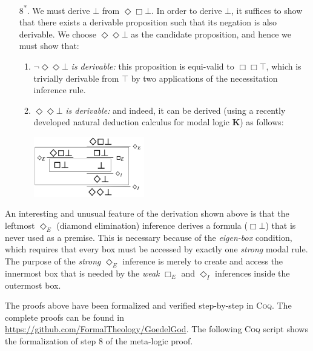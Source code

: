 \documentclass{llncs}
\newcommand{\logic}[1]{\textbf{#1}\xspace}
\newcommand{\K}{\logic{K}}
\newcommand{\Dia}{\Diamond} %
\newcommand{\nec}{\Box}
\newcommand{\pos}{\Dia}
\begin{document}
\begin{enumerate}
\item[8\textsuperscript{*}.] We must derive $\bot$ from $\pos \nec \bot$. In order to derive $\bot$, it suffices to show that there exists a derivable proposition such that its negation is also derivable. We choose $\pos \pos \bot$ as the candidate proposition, and hence we must show that:
\begin{enumerate}
\item $\neg \pos \pos \bot$ \emph{is derivable:} this proposition is equi-valid to $\nec \nec \top$, which is trivially derivable from $\top$ by two applications of the necessitation inference rule.

\item $\pos \pos \bot$ \emph{is derivable:} and indeed, it can be
  derived (using a recently developed natural deduction calculus for
  modal logic \K \cite{CSR}) as follows: \\

\begin{center}
\includegraphics[width=0.4\textwidth]{Derivation}
\end{center}

\end{enumerate}

\end{enumerate}

An interesting and unusual feature of the derivation shown above is that the leftmost $\pos_E$ (diamond elimination) inference derives a formula ($\nec \bot$) that is never used as a premise. This is necessary because of the \emph{eigen-box} condition, which requires that every box must be accessed by exactly one \emph{strong} modal rule. The purpose of the \emph{strong} $\pos_E$ inference is merely to create and access the innermost box that is needed by the \emph{weak} $\nec_E$ and $\pos_I$ inferences inside the outermost box.

The proofs above have been formalized and verified step-by-step in \textsc{Coq}. The complete proofs can be found in \url{https://github.com/FormalTheology/GoedelGod}. The following \textsc{Coq} script shows the formalization of step 8 of the meta-logic proof.
\end{document}
